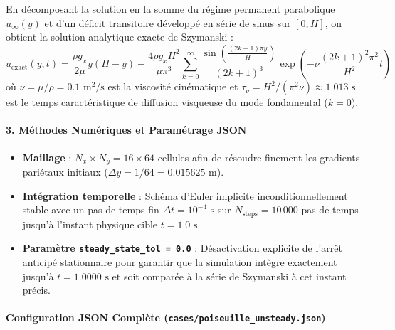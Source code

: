 \documentclass[
  10pt,
]{article}
\providecommand{\tightlist}{%
  \setlength{\itemsep}{0pt}\setlength{\parskip}{0pt}}
\begin{document}
En décomposant la solution en la somme du régime permanent parabolique
\(u_\infty(y)\) et d'un déficit transitoire développé en série de sinus
sur \([0, H]\), on obtient la solution analytique exacte de Szymanski :
\[u_{\text{exact}}(y, t) = \frac{\rho g_x}{2\mu} y (H - y) - \frac{4 \rho g_x H^2}{\mu \pi^3} \sum_{k=0}^{\infty} \frac{\sin\left(\frac{(2k+1)\pi y}{H}\right)}{(2k+1)^3} \exp\left( -\nu \frac{(2k+1)^2 \pi^2}{H^2} t \right)\]
où \(\nu = \mu / \rho = 0.1\text{ m}^2/\text{s}\) est la viscosité
cinématique et \(\tau_\nu = H^2 / (\pi^2 \nu) \approx 1.013\text{ s}\)
est le temps caractéristique de diffusion visqueuse du mode fondamental
(\(k=0\)).

\paragraph{3. Méthodes Numériques et Paramétrage
JSON}\label{muxe9thodes-numuxe9riques-et-paramuxe9trage-json-1}

\begin{itemize}
\tightlist
\item
  \textbf{Maillage} : \(N_x \times N_y = 16 \times 64\) cellules afin de
  résoudre finement les gradients pariétaux initiaux
  (\(\Delta y = 1/64 = 0.015625\text{ m}\)).
\item
  \textbf{Intégration temporelle} : Schéma d'Euler implicite
  inconditionnellement stable avec un pas de temps fin
  \(\Delta t = 10^{-4}\text{ s}\) sur \(N_{\text{steps}} = 10\,000\) pas
  de temps jusqu'à l'instant physique cible \(t = 1.0\text{ s}\).
\item
  \textbf{Paramètre \texttt{steady\_state\_tol\ =\ 0.0}} : Désactivation
  explicite de l'arrêt anticipé stationnaire pour garantir que la
  simulation intègre exactement jusqu'à \(t = 1.0000\text{ s}\) et soit
  comparée à la série de Szymanski à cet instant précis.
\end{itemize}

\paragraph{\texorpdfstring{Configuration JSON Complète
(\texttt{cases/poiseuille\_unsteady.json})}{Configuration JSON Complète (cases/poiseuille\_unsteady.json)}}\label{configuration-json-compluxe8te-casespoiseuille_unsteady.json}
\end{document}

